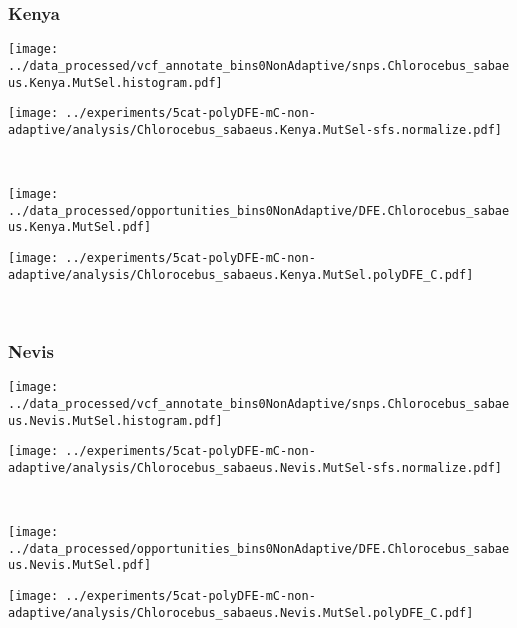 \subsubsection{Kenya}

\begin{minipage}{0.49\linewidth}
    \texttt{[image: ../data\_processed/vcf\_annotate\_bins0NonAdaptive/snps.Chlorocebus\_sabaeus.Kenya.MutSel.histogram.pdf]}
\end{minipage}
\begin{minipage}{0.49\linewidth}
    \texttt{[image: ../experiments/5cat-polyDFE-mC-non-adaptive/analysis/Chlorocebus\_sabaeus.Kenya.MutSel-sfs.normalize.pdf]}
\end{minipage}
\\
\begin{minipage}{0.49\linewidth}
    \texttt{[image: ../data\_processed/opportunities\_bins0NonAdaptive/DFE.Chlorocebus\_sabaeus.Kenya.MutSel.pdf]}
\end{minipage}
\begin{minipage}{0.49\linewidth}
    \texttt{[image: ../experiments/5cat-polyDFE-mC-non-adaptive/analysis/Chlorocebus\_sabaeus.Kenya.MutSel.polyDFE\_C.pdf]}
\end{minipage}
\\

\subsubsection{Nevis}

\begin{minipage}{0.49\linewidth}
    \texttt{[image: ../data\_processed/vcf\_annotate\_bins0NonAdaptive/snps.Chlorocebus\_sabaeus.Nevis.MutSel.histogram.pdf]}
\end{minipage}
\begin{minipage}{0.49\linewidth}
    \texttt{[image: ../experiments/5cat-polyDFE-mC-non-adaptive/analysis/Chlorocebus\_sabaeus.Nevis.MutSel-sfs.normalize.pdf]}
\end{minipage}
\\
\begin{minipage}{0.49\linewidth}
    \texttt{[image: ../data\_processed/opportunities\_bins0NonAdaptive/DFE.Chlorocebus\_sabaeus.Nevis.MutSel.pdf]}
\end{minipage}
\begin{minipage}{0.49\linewidth}
    \texttt{[image: ../experiments/5cat-polyDFE-mC-non-adaptive/analysis/Chlorocebus\_sabaeus.Nevis.MutSel.polyDFE\_C.pdf]}
\end{minipage}
\\

